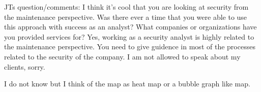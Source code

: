 JTs question/comments:  I think it's cool that you are looking at security from the maintenance perspective.  Was there ever a time that you were able to use this approach with success as an analyst?  What companies or organizations have you provided services for?
Yes, working as a security analyst is highly related to the maintenance perspective. You need to give guidence in most of the processes related to the security of the company. I am not allowed to speak about my clients, sorry.

I do not know but I think of the map as heat map or a bubble graph like map.




%
